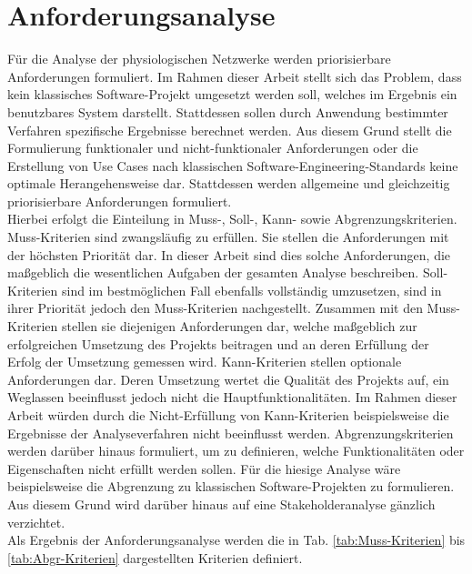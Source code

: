 \section{Anforderungsanalyse}

Für die Analyse der physiologischen Netzwerke werden priorisierbare Anforderungen formuliert. Im Rahmen dieser Arbeit stellt sich das Problem, dass kein klassisches Software-Projekt umgesetzt werden soll, welches im Ergebnis ein benutzbares System darstellt. Stattdessen sollen durch Anwendung bestimmter Verfahren spezifische Ergebnisse berechnet werden. Aus diesem Grund stellt die Formulierung funktionaler und nicht-funktionaler Anforderungen oder die Erstellung von Use Cases nach klassischen Software-Engineering-Standards keine optimale Herangehensweise dar. Stattdessen werden allgemeine und gleichzeitig priorisierbare Anforderungen formuliert.\\

Hierbei erfolgt die Einteilung in Muss-, Soll-, Kann- sowie Abgrenzungskriterien. Muss-Kriterien sind zwangsläufig zu erfüllen. Sie stellen die Anforderungen mit der höchsten Priorität dar. In dieser Arbeit sind dies solche Anforderungen, die maßgeblich die wesentlichen Aufgaben der gesamten Analyse beschreiben. Soll-Kriterien sind im bestmöglichen Fall ebenfalls vollständig umzusetzen, sind in ihrer Priorität jedoch den Muss-Kriterien nachgestellt. Zusammen mit den Muss-Kriterien stellen sie diejenigen Anforderungen dar, welche maßgeblich zur erfolgreichen Umsetzung des Projekts beitragen und an deren Erfüllung der Erfolg der Umsetzung gemessen wird. Kann-Kriterien stellen optionale Anforderungen dar. Deren Umsetzung wertet die Qualität des Projekts auf, ein Weglassen beeinflusst jedoch nicht die Hauptfunktionalitäten. Im Rahmen dieser Arbeit würden durch die Nicht-Erfüllung von Kann-Kriterien beispielsweise die Ergebnisse der Analyseverfahren nicht beeinflusst werden. Abgrenzungskriterien werden darüber hinaus formuliert, um zu definieren, welche Funktionalitäten oder Eigenschaften nicht erfüllt werden sollen. Für die hiesige Analyse wäre beispielsweise die Abgrenzung zu klassischen Software-Projekten zu formulieren. Aus diesem Grund wird darüber hinaus auf eine Stakeholderanalyse gänzlich verzichtet.\\

Als Ergebnis der Anforderungsanalyse werden die in Tab. \ref{tab:Muss-Kriterien} bis \ref{tab:Abgr-Kriterien} dargestellten Kriterien definiert.\\

